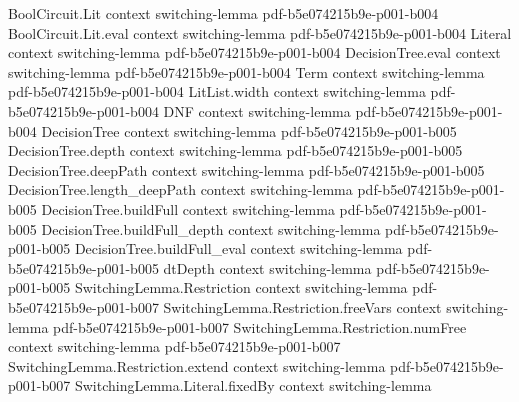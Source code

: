 \begin{lemma}
\label{SwitchingBernoulli.switching_fixedSize_bound}
\leanok
{}
\proofstep
  {BoolCircuit.Lit}
  {context}
  {switching-lemma}
  {pdf-b5e074215b9e-p001-b004}
\proofstep
  {BoolCircuit.Lit.eval}
  {context}
  {switching-lemma}
  {pdf-b5e074215b9e-p001-b004}
\proofstep
  {Literal}
  {context}
  {switching-lemma}
  {pdf-b5e074215b9e-p001-b004}
\proofstep
  {DecisionTree.eval}
  {context}
  {switching-lemma}
  {pdf-b5e074215b9e-p001-b004}
\proofstep
  {Term}
  {context}
  {switching-lemma}
  {pdf-b5e074215b9e-p001-b004}
\proofstep
  {LitList.width}
  {context}
  {switching-lemma}
  {pdf-b5e074215b9e-p001-b004}
\proofstep
  {DNF}
  {context}
  {switching-lemma}
  {pdf-b5e074215b9e-p001-b004}
\proofstep
  {DecisionTree}
  {context}
  {switching-lemma}
  {pdf-b5e074215b9e-p001-b005}
\proofstep
  {DecisionTree.depth}
  {context}
  {switching-lemma}
  {pdf-b5e074215b9e-p001-b005}
\proofstep
  {DecisionTree.deepPath}
  {context}
  {switching-lemma}
  {pdf-b5e074215b9e-p001-b005}
\proofstep
  {DecisionTree.length_deepPath}
  {context}
  {switching-lemma}
  {pdf-b5e074215b9e-p001-b005}
\proofstep
  {DecisionTree.buildFull}
  {context}
  {switching-lemma}
  {pdf-b5e074215b9e-p001-b005}
\proofstep
  {DecisionTree.buildFull_depth}
  {context}
  {switching-lemma}
  {pdf-b5e074215b9e-p001-b005}
\proofstep
  {DecisionTree.buildFull_eval}
  {context}
  {switching-lemma}
  {pdf-b5e074215b9e-p001-b005}
\proofstep
  {dtDepth}
  {context}
  {switching-lemma}
  {pdf-b5e074215b9e-p001-b005}
\proofstep
  {SwitchingLemma.Restriction}
  {context}
  {switching-lemma}
  {pdf-b5e074215b9e-p001-b007}
\proofstep
  {SwitchingLemma.Restriction.freeVars}
  {context}
  {switching-lemma}
  {pdf-b5e074215b9e-p001-b007}
\proofstep
  {SwitchingLemma.Restriction.numFree}
  {context}
  {switching-lemma}
  {pdf-b5e074215b9e-p001-b007}
\proofstep
  {SwitchingLemma.Restriction.extend}
  {context}
  {switching-lemma}
  {pdf-b5e074215b9e-p001-b007}
\proofstep
  {SwitchingLemma.Literal.fixedBy}
  {context}
  {switching-lemma}

\end{lemma}
